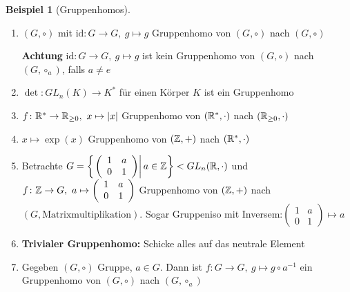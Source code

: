 \documentclass[12pt,a4paper]{article}
\theoremstyle{definition}
\theoremstyle{remark}
\theoremstyle{definition}
\theoremstyle{definition}
\newtheorem*{bsp}{Beispiel}
\theoremstyle{plain}
\theoremstyle{plain}
\begin{document}
\begin{bsp}[Gruppenhomos]
	\leavevmode
	\begin{enumerate}
		\item $(G,\circ)$ mit $\mbox{id}\colon G\to G,\ g\mapsto g$ Gruppenhomo von $(G,\circ)$ nach $(G,\circ)$
		
		\textbf{Achtung} $\mbox{id}\colon G\to G,\ g\mapsto g$ ist kein Gruppenhomo von $(G,\circ)$ nach $(G,\circ_a)$, falls $a\neq e$
		
		\item $\det\colon GL_n(K)\to K^*$ für einen Körper $K$ ist ein Gruppenhomo
		\item $f\colon \IR^*\to \IR_{\geq 0},\ x\mapsto |x|$ Gruppenhomo von $(\mathbb R^*,\cdot)$ nach $(\mathbb R_{\geq 0}, \cdot)$
		\item $x\mapsto \exp(x)$ Gruppenhomo von $(\mathbb Z,+)$ nach $(\mathbb R^*,\cdot)$
		\item Betrachte $G = \left\{\left.\left(\begin{array}{cc}
		1 & a \\ 
		0 & 1
		\end{array} \right)\right\vert a\in\mathbb Z\right\}<GL_n(\mathbb R,\cdot)$ und $f\colon \mathbb Z\to G,\ a\mapsto\left(\begin{array}{cc}
		1 & a \\ 
		0 & 1
		\end{array} \right)$ Gruppenhomo von $(\mathbb Z,+)$ nach $(G,\mbox{Matrixmultiplikation})$. Sogar Gruppeniso mit Inversem:$\left(\begin{array}{cc}
		1 & a \\ 
		0 & 1
		\end{array} \right)\mapsto a$
		\item \textbf{Trivialer Gruppenhomo:} Schicke alles auf das neutrale Element
		\item Gegeben $(G,\circ)$ Gruppe, $a\in G$. Dann ist $f\colon G\to G,\ g\mapsto g\circ a^{-1}$ ein Gruppenhomo von $(G,\circ)$ nach $(G,\circ_a)$
	\end{enumerate}
\end{bsp}
\end{document}
